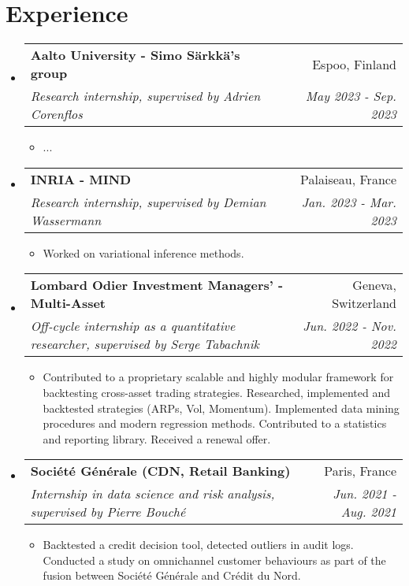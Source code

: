 \documentclass[letterpaper,10pt]{article}
\makeatletter
\newcommand{\up}[1]{\textsuperscript{#1}}
\newcommand{\resumeItem}[1]{
    \item\small{
            {#1 \vspace{-2pt}}
    }
}
\newcommand{\resumeSubheading}[4]{
    \vspace{-2pt}\item
    \begin{tabular*}{0.97\textwidth}[t]{l@{\extracolsep{\fill}}r}
        \textbf{#1}       & #2                 \\
        \textit{\small#3} & \textit{\small #4} \\
    \end{tabular*}\vspace{-7pt}
}
\newcommand{\resumeSubHeadingListStart}{\begin{itemize}[leftmargin=0.15in, label={}]}
\newcommand{\resumeSubHeadingListEnd}{\end{itemize}}
\newcommand{\resumeItemListStart}{\begin{itemize}}
\newcommand{\resumeItemListEnd}{\end{itemize}\vspace{-5pt}}
\makeatother
\begin{document}
\section{Experience}
\resumeSubHeadingListStart
\resumeSubheading
{Aalto University - Simo Särkkä's group}{Espoo, Finland}
{Research internship, supervised by Adrien Corenflos}{May 2023 - Sep. 2023}
\resumeItemListStart
\resumeItem{...}
\resumeItemListEnd
\resumeSubheading
{INRIA - MIND}{Palaiseau, France}
{Research internship, supervised by Demian Wassermann}{Jan. 2023 - Mar. 2023}
\resumeItemListStart
\resumeItem{Worked on variational inference methods.}
\resumeItemListEnd
\resumeSubheading
{Lombard Odier Investment Managers' - Multi-Asset}{Geneva, Switzerland}
{Off-cycle internship as a quantitative researcher, supervised by Serge Tabachnik}{Jun. 2022 - Nov. 2022}
\resumeItemListStart
\resumeItem{Contributed to a proprietary scalable and highly modular framework for backtesting cross-asset trading strategies. Researched, implemented and backtested strategies (ARPs, Vol, Momentum). Implemented data mining procedures and modern regression methods. Contributed to a statistics and reporting library. Received a renewal offer.}
\resumeItemListEnd
\resumeSubheading
{Société Générale (CDN, Retail Banking)}{Paris, France}%
{Internship in data science and risk analysis, supervised by Pierre Bouché}{Jun. 2021 - Aug. 2021}
\resumeItemListStart
\resumeItem{Backtested a credit decision tool, detected outliers in audit logs. Conducted a study on omnichannel customer behaviours as part of the fusion between Société Générale and Crédit du Nord.}
\resumeItemListEnd
\resumeSubHeadingListEnd
\end{document}
